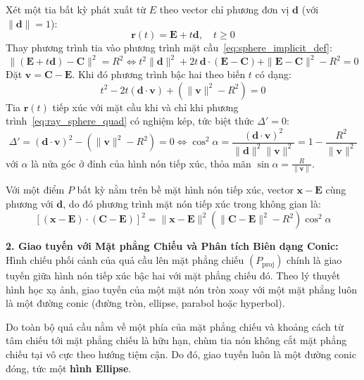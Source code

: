 Xét một tia bất kỳ phát xuất từ $E$ theo vector chỉ phương đơn vị $\mathbf{d}$ (với $\|\mathbf{d}\| = 1$):
\begin{equation}
\mathbf{r}(t) = \mathbf{E} + t \mathbf{d}, \quad t \ge 0
\end{equation}
Thay phương trình tia vào phương trình mặt cầu~\eqref{eq:sphere_implicit_def}:
\begin{equation}
\|(\mathbf{E} + t \mathbf{d}) - \mathbf{C}\|^2 = R^2 \iff t^2 \|\mathbf{d}\|^2 + 2t \, \mathbf{d} \cdot (\mathbf{E} - \mathbf{C}) + \|\mathbf{E} - \mathbf{C}\|^2 - R^2 = 0
\end{equation}
Đặt $\mathbf{v} = \mathbf{C} - \mathbf{E}$. Khi đó phương trình bậc hai theo biến $t$ có dạng:
\begin{equation}
\label{eq:ray_sphere_quad}
t^2 - 2t(\mathbf{d} \cdot \mathbf{v}) + (\|\mathbf{v}\|^2 - R^2) = 0
\end{equation}
Tia $\mathbf{r}(t)$ tiếp xúc với mặt cầu khi và chỉ khi phương trình~\eqref{eq:ray_sphere_quad} có nghiệm kép, tức biệt thức $\Delta' = 0$:
\begin{equation}
\label{eq:cone_condition}
\Delta' = (\mathbf{d} \cdot \mathbf{v})^2 - (\|\mathbf{v}\|^2 - R^2) = 0 \iff \cos^2\alpha = \frac{(\mathbf{d} \cdot \mathbf{v})^2}{\|\mathbf{d}\|^2 \|\mathbf{v}\|^2} = 1 - \frac{R^2}{\|\mathbf{v}\|^2}
\end{equation}
với $\alpha$ là nửa góc ở đỉnh của hình nón tiếp xúc, thỏa mãn $\sin\alpha = \frac{R}{\|\mathbf{v}\|}$.

Với một điểm $P$ bất kỳ nằm trên bề mặt hình nón tiếp xúc, vector $\mathbf{x} - \mathbf{E}$ cùng phương với $\mathbf{d}$, do đó phương trình mặt nón tiếp xúc trong không gian là:
\begin{equation}
\label{eq:cone_equation_3d}
[(\mathbf{x} - \mathbf{E}) \cdot (\mathbf{C} - \mathbf{E})]^2 = \|\mathbf{x} - \mathbf{E}\|^2 \left( \|\mathbf{C} - \mathbf{E}\|^2 - R^2 \right) \cos^2\alpha
\end{equation}

\textbf{2. Giao tuyến với Mặt phẳng Chiếu và Phân tích Biên dạng Conic:}
Hình chiếu phối cảnh của quả cầu lên mặt phẳng chiếu $(P_{\text{proj}})$ chính là giao tuyến giữa hình nón tiếp xúc bậc hai với mặt phẳng chiếu đó. Theo lý thuyết hình học xạ ảnh, giao tuyến của một mặt nón tròn xoay với một mặt phẳng luôn là một đường conic (đường tròn, ellipse, parabol hoặc hyperbol).

Do toàn bộ quả cầu nằm về một phía của mặt phẳng chiếu và khoảng cách từ tâm chiếu tới mặt phẳng chiếu là hữu hạn, chùm tia nón không cắt mặt phẳng chiếu tại vô cực theo hướng tiệm cận. Do đó, giao tuyến luôn là một đường conic đóng, tức một \textbf{hình Ellipse}.

